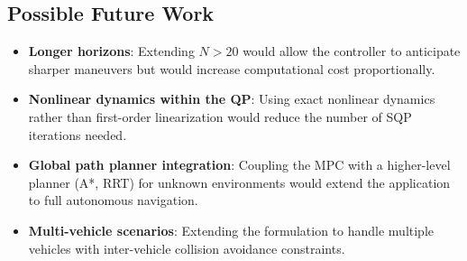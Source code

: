﻿\documentclass[11pt,a4paper]{article}
\begin{document}
\subsection{Possible Future Work}
\begin{itemize}[leftmargin=1.2cm]
  \item \textbf{Longer horizons}: Extending $N > 20$ would allow the controller to anticipate sharper maneuvers but would increase computational cost proportionally.
  \item \textbf{Nonlinear dynamics within the QP}: Using exact nonlinear dynamics rather than first-order linearization would reduce the number of SQP iterations needed.
  \item \textbf{Global path planner integration}: Coupling the MPC with a higher-level planner (A*, RRT) for unknown environments would extend the application to full autonomous navigation.
  \item \textbf{Multi-vehicle scenarios}: Extending the formulation to handle multiple vehicles with inter-vehicle collision avoidance constraints.
\end{itemize}
\end{document}
